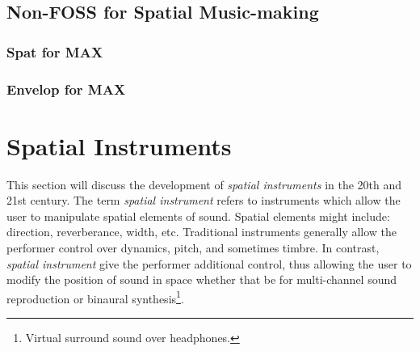 

\subsection{Non-FOSS for Spatial Music-making}

\subsubsection{Spat for MAX}

\subsubsection{Envelop for MAX}

    


\section{Spatial Instruments}

This section will discuss the development of \textit{spatial instruments} in the 20th and 21st century. The term \textit{spatial instrument} refers to instruments which allow the user to manipulate spatial elements of sound. Spatial elements might include: direction, reverberance, width, etc. Traditional instruments generally allow the performer control over dynamics, pitch, and sometimes timbre. In contrast, \textit{spatial instrument} give the performer additional control, thus allowing the user to modify the position of sound in space whether that be for multi-channel sound reproduction or binaural synthesis\footnote{Virtual surround sound over headphones.}. 

